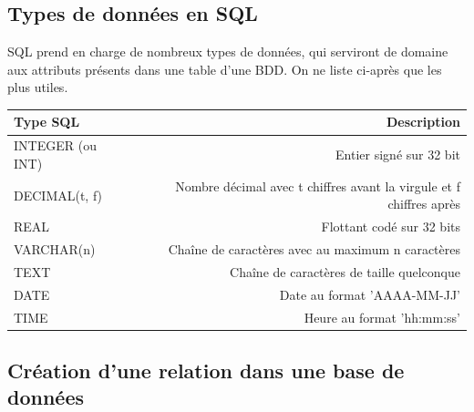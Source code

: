 \documentclass[french,11pt,twoside]{VcCours}
\begin{document}
\subsection{Types de données en SQL}

SQL prend en charge de nombreux types de données,
qui serviront de domaine aux attributs présents dans une table d'une BDD. On ne liste ci-après que les plus utiles.

\begin{center}
\begin{tabular}[c]{|l|r|} \hline
Type SQL & Description\\ \hline
INTEGER (ou INT) & Entier signé sur 32 bit\\ \hline
DECIMAL(t, f) & Nombre décimal avec t chiffres avant la virgule et f chiffres après\\ \hline
REAL & Flottant codé sur 32 bits\\ \hline
VARCHAR(n) & Chaîne de caractères avec au maximum n caractères\\ \hline
TEXT & Chaîne de caractères de taille quelconque\\ \hline
DATE & Date au format 'AAAA-MM-JJ'\\ \hline
TIME & Heure au format 'hh:mm:ss'\\  \hline
\end{tabular}
\end{center}


\subsection{Création d'une relation dans une base de données}
\end{document}
